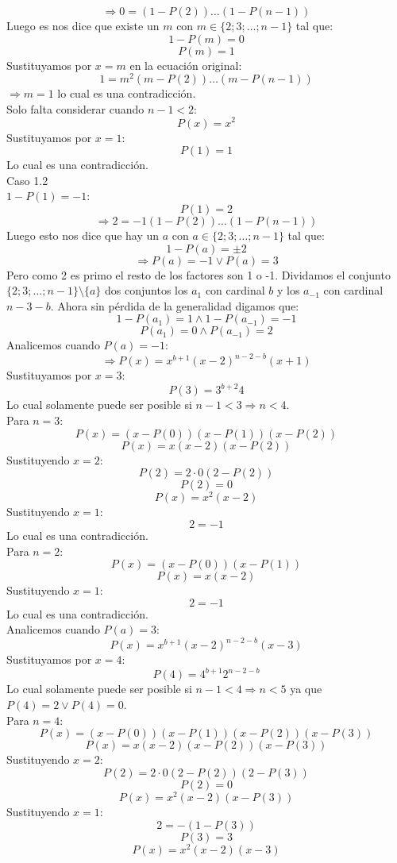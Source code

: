 \documentclass{book}
\begin{document}
\begin{enumerate}
        $$\Rightarrow 0=(1-P(2))\ldots(1-P(n-1))$$
        Luego es nos dice que existe un $m$ con $m\in\{2;3;\ldots;n-1\}$ tal que:
        $$1-P(m)=0$$
        $$P(m)=1$$
        Sustituyamos por $x=m$ en la ecuación original:
        $$1=m^2(m-P(2))\ldots(m-P(n-1))$$
        $\Rightarrow m=1$ lo cual es una contradicción.\\
        Solo falta considerar cuando $n-1<2$:
        $$P(x)=x^2$$
        Sustituyamos por $x=1$:
        $$P(1)=1$$
        Lo cual es una contradicción.\\
        Caso 1.2 \\$1-P(1)=-1$:
        $$P(1)=2$$
        $$\Rightarrow 2=-1(1-P(2))\ldots(1-P(n-1))$$
        Luego esto nos dice que hay un $a$ con $a\in\{2;3;\ldots;n-1\}$ tal que:
        $$1-P(a)=\pm 2$$
        $$\Rightarrow P(a)=-1\vee P(a)=3$$
        Pero como 2 es primo el resto de los factores son 1 o -1. Dividamos el conjunto $\{2;3;\ldots;n-1\}\setminus \{a\}$ dos conjuntos los $a_1$ con cardinal $b$ y los $a_{-1}$ con cardinal $n-3-b$. Ahora sin pérdida de la generalidad digamos que:
        $$1-P(a_1)=1\wedge 1-P(a_{-1})=-1$$
        $$P(a_1)=0\wedge P(a_{-1})=2$$
        Analicemos cuando $P(a)=-1$:
        $$\Rightarrow P(x)=x^{b+1}{(x-2)}^{n-2-b}(x+1)$$
        Sustituyamos por $x=3$:
        $$P(3)=3^{b+2}4$$
        Lo cual solamente puede ser posible si $n-1<3\Rightarrow n<4$.\\
        Para $n=3$:
        $$P(x)=(x-P(0))(x-P(1))(x-P(2))$$
        $$P(x)=x(x-2)(x-P(2))$$
        Sustituyendo $x=2$:
        $$P(2)=2\cdot 0(2-P(2))$$
        $$P(2)=0$$
        $$P(x)=x^2(x-2)$$
        Sustituyendo $x=1$:
        $$2=-1$$
        Lo cual es una contradicción.\\
        Para $n=2$:
        $$P(x)=(x-P(0))(x-P(1))$$
        $$P(x)=x(x-2)$$
        Sustituyendo $x=1$:
        $$2=-1$$
        Lo cual es una contradicción.\\
        Analicemos cuando $P(a)=3$:
        $$P(x)=x^{b+1}{(x-2)}^{n-2-b}(x-3)$$
        Sustituyamos por $x=4$:
        $$P(4)=4^{b+1}{2}^{n-2-b}$$
        Lo cual solamente puede ser posible si $n-1<4\Rightarrow n<5$ ya que $P(4)=2\vee P(4)=0$.\\
        Para $n=4$:
        $$P(x)=(x-P(0))(x-P(1))(x-P(2))(x-P(3))$$
        $$P(x)=x(x-2)(x-P(2))(x-P(3))$$
        Sustituyendo $x=2$:
        $$P(2)=2\cdot 0(2-P(2))(2-P(3))$$
        $$P(2)=0$$
        $$P(x)=x^2(x-2)(x-P(3))$$
        Sustituyendo $x=1$:
        $$2=-(1-P(3))$$
        $$P(3)=3$$
        $$P(x)=x^2(x-2)(x-3)$$

\end{enumerate}
\end{document}
